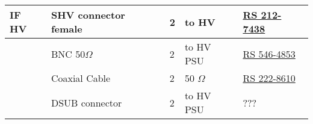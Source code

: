 {\begin{center}
\begin{xtabular}{|l|l|l|l|l|}
\hline
{}\textbf{IF HV}        & SHV connector female      & 2 & to HV       & \href{https://jp.rs-online.com/web/p/shv-connectors/2127438/}{RS 212-7438}                                                  \\
\hline
{}                      & BNC 50$\Omega$            & 2 & to HV PSU   & \href{https://jp.rs-online.com/web/p/bnc-connectors/5464853}{RS 546-4853}                                                   \\
\hline
{}                      & Coaxial Cable             & 2 & 50 $\Omega$ & \href{https://jp.rs-online.com/web/p/coaxial-cable/2228610/}{RS 222-8610}                                                   \\
\hline
{}                      & DSUB connector            & 2 & to HV PSU   & ???                                                                                                                         \\
\hline
\end{xtabular}
\end{center}
} 
